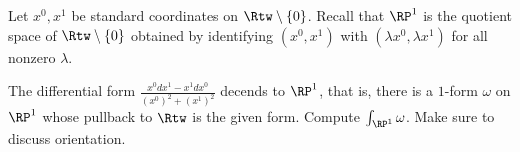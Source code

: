 Let $x^0,x^1$ be standard coordinates on $\Rtw\setminus \{0\}$. Recall
that $\RP^1$ is the quotient space of $\Rtw\setminus \{0\}$ obtained
by identifying $(x^0,x^1)$ with $(\lambda x^0,\lambda x^1)$ for all
nonzero $\lambda$.  

The differential form $\frac{x^0 dx^1-x^1 dx^0}{(x^0)^2+(x^1)^2}$
decends to $\RP^1$, that is, there is a $1$-form $\omega$ on $\RP^1$
whose pullback to $\Rtw$ is the given form. Compute
$\int_{\RP^1}\omega$. Make sure to discuss orientation.
